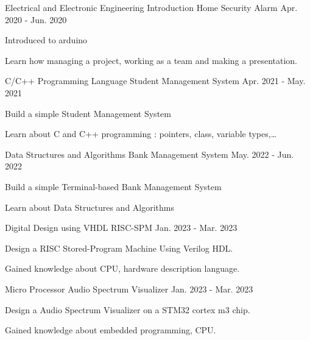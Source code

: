 \begin{cventries}
  \cventry
  {Electrical and Electronic Engineering Introduction}
  {Home Security Alarm}
  {}
  {Apr. 2020 - Jun. 2020}
  {
    \begin{cvitems}
      \item {Introduced to arduino}
      \item {Learn how managing a project, working as a team and making a presentation.}
    \end{cvitems}
  }
\end{cventries}

\begin{cventries}
  \cventry
  {C/C++ Programming Language}
  {Student Management System}
  {}
  {Apr. 2021 - May. 2021}
  {
    \begin{cvitems}
      \item {Build a simple Student Management System}
      \item {Learn about C and C++ programming : pointers, class, variable types,\dots}
    \end{cvitems}
  }
\end{cventries}

\begin{cventries}
  \cventry
  {Data Structures and Algorithms}
  {Bank Management System}
  {}
  {May. 2022 - Jun. 2022}
  {
    \begin{cvitems}
      \item {Build a simple Terminal-based Bank Management System}
      \item {Learn about Data Structures and Algorithms}
    \end{cvitems}
  }
\end{cventries}

\begin{cventries}
  \cventry
  {Digital Design using VHDL}
  {RISC-SPM}
  {}
  {Jan. 2023 - Mar. 2023}
  {
    \begin{cvitems}
      \item {Design a RISC Stored-Program Machine Using Verilog HDL.}
      \item {Gained knowledge about CPU, hardware description language.}
    \end{cvitems}
  }
\end{cventries}

\begin{cventries}
  \cventry
  {Micro Processor}
  {Audio Spectrum Visualizer}
  {}
  {Jan. 2023 - Mar. 2023}
  {
    \begin{cvitems}
      \item {Design a Audio Spectrum Visualizer on a STM32 cortex m3 chip.}
      \item {Gained knowledge about embedded programming, CPU.}
    \end{cvitems}
  }
\end{cventries}

